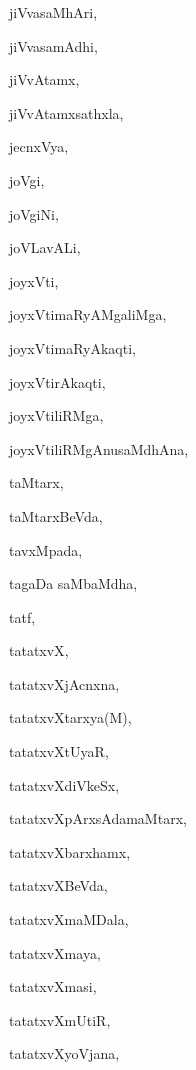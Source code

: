 \begin{multicols}{2}
{jiVvasaMhAri}, \pageref{jiVvasaMhAri}

{jiVvasamAdhi}, \pageref{jiVvasamAdhi}

{jiVvAtamx}, \pageref{jiVvAtamx}

{jiVvAtamxsathxla}, \pageref{jiVvAtamxsathxla}

{jecnxVya}, \pageref{jecnxVya}

{joVgi}, \pageref{joVgi}

{joVgiNi}, \pageref{joVgiNi}

{joVLavALi}, \pageref{joVLavALi}

{joyxVti}, \pageref{joyxVti}

{joyxVtimaRyAMgaliMga}, \pageref{joyxVtimaRyAMgaliMga}

{joyxVtimaRyAkaqti}, \pageref{joyxVtimaRyAkaqti}

{joyxVtirAkaqti}, \pageref{joyxVtirAkaqti}

{joyxVtiliRMga}, \pageref{joyxVtiliRMga}

{joyxVtiliRMgAnusaMdhAna}, \pageref{joyxVtiliRMgAnusaMdhAna}

{taMtarx}, \pageref{taMtarx}

{taMtarxBeVda}, \pageref{taMtarxBeVda}

{tavxMpada}, \pageref{tavxMpada}

{tagaDa saMbaMdha}, \pageref{tagaDa saMbaMdha}

{tatf}, \pageref{tatf}

{tatatxvX}, \pageref{tatatxvX}

{tatatxvXjAcnxna}, \pageref{tatatxvXjAcnxna}

{tatatxvXtarxya(M)}, \pageref{tatatxvXtarxya(M)}

{tatatxvXtUyaR}, \pageref{tatatxvXtUyaR}

{tatatxvXdiVkeSx}, \pageref{tatatxvXdiVkeSx}

{tatatxvXpArxsAdamaMtarx}, \pageref{tatatxvXpArxsAdamaMtarx}

{tatatxvXbarxhamx}, \pageref{tatatxvXbarxhamx}

{tatatxvXBeVda}, \pageref{tatatxvXBeVda}

{tatatxvXmaMDala}, \pageref{tatatxvXmaMDala}

{tatatxvXmaya}, \pageref{tatatxvXmaya}

{tatatxvXmasi}, \pageref{tatatxvXmasi}

{tatatxvXmUtiR}, \pageref{tatatxvXmUtiR}

{tatatxvXyoVjana}, \pageref{tatatxvXyoVjana}


\end{multicols}
